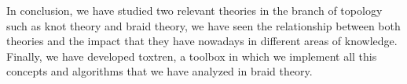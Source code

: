 \newpage
In conclusion, we have studied two relevant theories in the branch of topology such as knot theory and braid theory, we have seen the relationship between both theories and the impact that they have nowadays in different areas of knowledge. Finally, we have developed toxtren, a toolbox in which we implement all this concepts and algorithms that we have analyzed in braid theory.\\










